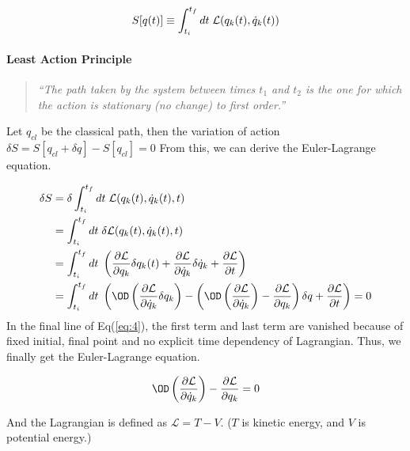 \documentclass[final]{IEEEphot}
\newcommand{\PD}[2]{\dfrac{\partial #1}{\partial #2}} %
\renewcommand{\L}{\mathcal{L}} %
\newcommand{\Lag}[1][q_k(t), \dot{q}_k(t),t]{\mathcal{L}( #1 )} %
\newcommand{\Act}[1][\Lag{}]{\int_{t_i}^{t_f}dt \hs #1} %
\newcommand{\BKS}[1]{\left( #1 \right)} %
\newcommand{\VS}{\vspace{0.3cm}} %
\newcommand{\hs}{\hspace{0.1cm}} %
\begin{document}
\begin{equation*}
 S[q(t)] \equiv \int_{t_i}^{t_f} dt \hs \mathcal{L} (q_k (t), \dot{q}_k (t))
\end{equation*}
\paragraph{Least Action Principle}
\VS
\begin{quote}
\textit{``The path taken by the system between times $t_1$ and $t_2$ is the one for which the action is stationary (no change) to first order.\footnotemark[3]'' }
\end{quote}
\VS

Let $q_{cl}$ be the classical path, then the variation of action $\delta S =  S[q_{cl} +\delta q] - S[q_{cl}] = 0$ 
From this, we can derive the Euler-Lagrange equation.

\begin{equation}
\label{eq:4}
 \begin{split}
  \delta S & = \delta \Act{}\\
           & = \Act[\delta \Lag{}]\\
           & = \Act[\BKS{\PD{\L}{q_k} \delta q_k(t) + \PD{\L}{\dot{q}_k} \delta \dot{q}_k + \PD{\L}{t}}]\\
           & = \Act[\BKS{\OD \BKS{\PD{\L}{\dot{q}_k} \delta q_k} - \BKS{\OD\BKS{\PD{\L}{\dot{q}_k}} - \PD{\L}{q_k} }\delta q + \PD{\L}{t}}] = 0
 \end{split}
\end{equation}
In the final line of Eq(\ref{eq:4}), the first term and last term are vanished because of fixed initial, final point and no explicit time dependency of Lagrangian.
Thus, we finally get the Euler-Lagrange equation.

\begin{equation}
 \OD\BKS{\PD{\L}{\dot{q}_k}} - \PD{\L}{q_k} = 0
\end{equation}

And the Lagrangian is defined as $\L = T - V$. ($T$ is kinetic energy, and $V$ is potential energy.)

\VS
\VS
\VS
\end{document}
